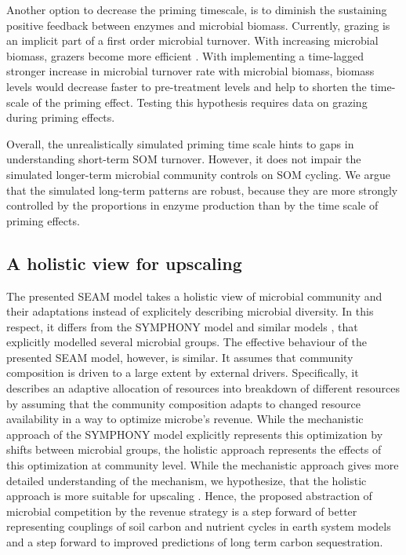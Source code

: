 Another option to decrease the priming timescale, is to diminish the sustaining
positive feedback between enzymes and microbial biomass. Currently, grazing is
an implicit part of a first order microbial turnover. With increasing microbial
biomass, grazers become more efficient \citep{Clarholm81}. With implementing a
time-lagged stronger increase in microbial turnover rate with microbial biomass,
biomass levels would decrease faster to pre-treatment levels and help to shorten
the time-scale of the priming effect. Testing this hypothesis requires data on
grazing during priming effects.

Overall, the unrealistically simulated priming time scale hints to gaps in
understanding short-term SOM turnover. However, it does not impair the simulated
longer-term microbial community controls on SOM cycling. We argue that the
simulated long-term patterns are robust, because they are more strongly
controlled by the proportions in enzyme production than by the time scale of
priming effects.

\subsection{A holistic view for upscaling}
\label{sec:Holistic}

The presented SEAM model takes a holistic view \citep{Panikov10} of
microbial community and their adaptations instead of explicitely describing
microbial diversity.
In this respect, it differs from the SYMPHONY model \citep{Perveen14} and
similar models \citep{Fontaine03}, that explicitly modelled several
microbial groups.
The effective behaviour of the presented SEAM model, however, is similar.
It assumes that community composition is driven to a large extent by external
drivers. Specifically, it describes an adaptive allocation
of resources into breakdown of different resources by assuming that the
community composition adapts to changed resource availability in a way to
optimize microbe's revenue.
While the mechanistic approach of the SYMPHONY model explicitly represents this
optimization by shifts between microbial groups, the holistic approach
represents the effects of this optimization at community level.
While the mechanistic approach gives more detailed understanding of the mechanism,
we hypothesize, that the holistic approach is more suitable for upscaling
\citep{Wutzler13}.
Hence, the proposed abstraction of microbial competition by the revenue strategy
is a step forward of better representing couplings of soil carbon and nutrient
cycles in earth system models and a step forward to improved predictions of long
term carbon sequestration.

